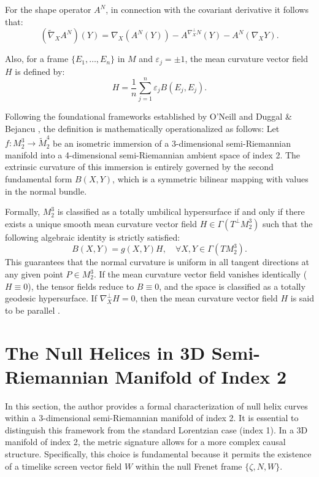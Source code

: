 \documentclass [reqno]{amsart}
\theoremstyle{plain}
\numberwithin{equation}{section}
\begin{document}
For the shape operator $A^N$, in connection with the covariant derivative it follows that:
\begin{equation}
(\tilde{\nabla}_X A^N)(Y) = \nabla_X (A^N(Y)) - A^{\nabla_X^\perp N}(Y) - A^N(\nabla_X Y).
\end{equation}

Also, for a frame $\{E_1, \dots, E_n\}$ in $M$ and $\varepsilon_j = \pm 1$, the mean curvature vector field $H$ is defined by:
\begin{equation}
H = \frac{1}{n} \sum_{j=1}^n \varepsilon_j B(E_j, E_j).
\end{equation}

Following the foundational frameworks established by O'Neill \cite{11} and Duggal \& Bejancu \cite{4}, the definition is mathematically operationalized as follows:
Let $f: M_2^3 \rightarrow \tilde{M}_2^4$ be an isometric immersion of a 3-dimensional semi-Riemannian manifold into a 4-dimensional semi-Riemannian ambient space of index 2. The extrinsic curvature of this immersion is entirely governed by the second fundamental form $B(X,Y)$, which is a symmetric bilinear mapping with values in the normal bundle.

Formally, $M_2^3$ is classified as a totally umbilical hypersurface if and only if there exists a unique smooth mean curvature vector field $H \in \Gamma(T^\perp M_2^3)$ such that the following algebraic identity is strictly satisfied:
\begin{equation}
B(X,Y) = g(X,Y)H, \quad \forall X,Y \in \Gamma(TM_2^3).
\end{equation}
This guarantees that the normal curvature is uniform in all tangent directions at any given point $P \in M_2^3$. If the mean curvature vector field vanishes identically ($H \equiv 0$), the tensor fields reduce to $B \equiv 0$, and the space is classified as a totally geodesic hypersurface. If $\nabla_X^\perp H = 0$, then the mean curvature vector field $H$ is said to be parallel \cite{5,7,10,11}.
\section{The Null Helices in 3D Semi-Riemannian Manifold of Index 2}

In this section, the author provides a formal characterization of null helix curves within a 3-dimensional semi-Riemannian manifold of index 2. It is essential to distinguish this framework from the standard Lorentzian case (index 1). In a 3D manifold of index 2, the metric signature allows for a more complex causal structure. Specifically, this choice is fundamental because it permits the existence of a timelike screen vector field $W$ within the null Frenet frame $\{\zeta,N,W\}$.
\end{document}

